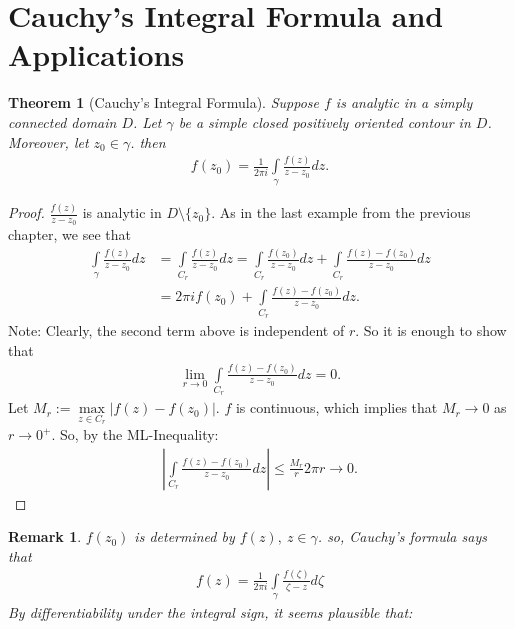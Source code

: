 \documentclass[12pt, a4paper]{article}
\theoremstyle{plain}
\newtheorem{thm}{Theorem} %
\newtheorem{rem}{Remark}
\theoremstyle{definition}
\begin{document}
	\section{Cauchy's Integral Formula and Applications} %
	\label{sec:cauchy_s_integral_formula_and_applications}
		\begin{thm}[Cauchy's Integral Formula]
			Suppose $f$ is analytic in a simply connected domain $D$. Let $\gamma$ be a simple closed positively oriented contour in $D$. Moreover, let $z_0\in \gamma$. then
			\begin{align*}
				f(z_0) = \frac{1}{2\pi i}\int\limits_{\gamma}\frac{f(z)}{z-z_0}dz.
			\end{align*}
		\end{thm}

		\begin{proof}
			$\displaystyle \frac{f(z)}{z-z_0}$ is analytic in $D\setminus\{z_0\}$. As in the last example from the previous chapter, we see that
			\begin{align*}
				\int\limits_{\gamma}\frac{f(z)}{z-z_0}dz &= 
				\int\limits_{C_r}\frac{f(z)}{z-z_0}dz =
				\int\limits_{C_r}\frac{f(z_0)}{z-z_0}dz +
				\int\limits_{C_r}\frac{f(z)-f(z_0)}{z-z_0}dz \\ &=
				2\pi i f(z_0) + \int\limits_{C_r}\frac{f(z)-f(z_0)}{z-z_0}dz.
			\end{align*}
			Note: Clearly, the second term above is independent of $r$. So it is enough to show that
			\begin{align*}
				\lim\limits_{r\to 0}\int\limits_{C_r}\frac{f(z)-f(z_0)}{z-z_0}dz = 0.
			\end{align*}
			Let $M_r:=\max\limits_{z\in C_r}|f(z)-f(z_0)|$. $f$ is continuous, which implies that $M_r\to 0$ as $r\to 0^+$. So, by the ML-Inequality:
			\begin{align*}
				\left|\int\limits_{C_r}\frac{f(z)-f(z_0)}{z-z_0}dz\right|\le
				\frac{M_r}{r}2\pi r \to 0.
			\end{align*}
		\end{proof}

		\begin{rem}
			$f(z_0)$ is determined by $f(z),\:z\in \gamma$. so, Cauchy's formula says that
			\begin{align*}
				f(z) = \frac{1}{2\pi i}\int\limits_{\gamma}\frac{f(\zeta)}{\zeta-z}d \zeta\tag*{$z$ interior to $\gamma$.}
			\end{align*}
			By differentiability under the integral sign, it seems plausible that:\\
		\end{rem}
\end{document}
